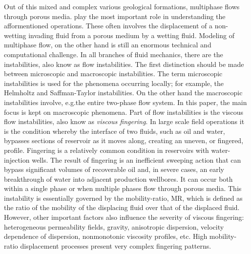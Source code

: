 \documentclass[preprint,authoryear,12pt]{elsarticle}
\begin{document}
\medskip
Out of this mixed and complex various geological formations, multiphase flows through porous media. play the most important role in understanding the afformentioned operations. These often involves the displacement of a non-wetting invading fluid from a porous medium by a wetting fluid. Modeling of multiphase flow, on the other hand is still an enormous technical and computational challenge. In all branches of fluid mechanics, there are the instabilities, also know as flow instabilities. The first distinction should be made between microscopic and macroscopic instabilities. The term microscopic instabilities is used for the phenomena occurring locally; for example, the Helmholtz and Saffman-Taylor instabilities. On the other hand the macroscopic instabilities involve, e.g.the entire two-phase flow system. In this paper, the main focus is kept on macroscopic phenomena. Part of flow instabilities is the viscous flow instabilities, also know as \textit{viscous fingering}. In large scale field operations it is the condition whereby the interface of two fluids, such as oil and water, bypasses sections of reservoir as it moves along, creating an uneven, or fingered, profile. Fingering is a relatively common condition in reservoirs with water-injection wells. The result of fingering is an inefficient sweeping action that can bypass significant volumes of recoverable oil and, in severe cases, an early breakthrough of water into adjacent production wellbores. It can occur both within a single phase or when multiple phases flow through porous media. This instability is essentially governed by the mobility-ratio, MR, which is defined as the ratio of the mobility of the displacing fluid over that of the displaced fluid. %
However, other important factors also influence the severity of viscous fingering: heterogeneous permeability fields, gravity, anisotropic dispersion, velocity dependence of dispersion, nonmonotonic viscosity profiles, etc. High mobility-ratio displacement processes present very  complex  fingering  patterns.  

\end{document}
